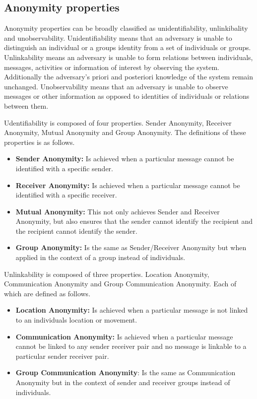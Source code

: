 \documentclass{llncs}
\begin{document}
\subsection{Anonymity properties}
Anonymity properties can be broadly classified as unidentifiability, unlinkibality and unobservability. Unidentifiability means that an adversary is unable to distinguish an individual or a groups identity from a set of individuals or groups. Unlinkability means an adversary is unable to form relations between individuals, messages, activities or information of interest by observing the system. Additionally the adversary's priori and posteriori knowledge of the system remain unchanged. Unobservability means that an adversary is unable to observe messages or other information as opposed to identities of individuals or relations between them.

Udentifiability is composed of four properties. Sender Anonymity, Receiver Anonymity, Mutual Anonymity and Group Anonymity. The definitions of these properties is as follows.
\begin{itemize}
\item[]{\textbf{Sender Anonymity:} Is achieved when a particular message cannot be identified with a specific sender.}
\item[]{\textbf{Receiver Anonymity:} Is achieved when a particular message cannot be identified with a specific receiver.}
\item[]{\textbf{Mutual Anonymity:} This not only achieves Sender and Receiver Anonymity, but also ensures that the sender cannot identify the recipient and the recipient cannot identify the sender.}
\item[]{\textbf{Group Anonymity:} Is the same as Sender/Receiver Anonymity but when applied in the context of a group instead of individuals.}
\end{itemize}

Unlinkability is composed of three properties. Location Anonymity, Communication Anonymity and Group Communication Anonymity. Each of which are defined as follows.
\begin{itemize}
	\item[]{\textbf{Location Anonymity:} Is achieved when a particular message is not linked to an individuals location or movement.}
	\item[]{\textbf{Communication Anonymity:} Is achieved when a particular message cannot be linked to any sender receiver pair and no message is linkable to a particular sender receiver pair.}
	\item[]{\textbf{Group Communication Anonymity}: Is the same as Communication Anonymity but in the context of sender and receiver groups instead of individuals.}
\end{itemize}
\end{document}
